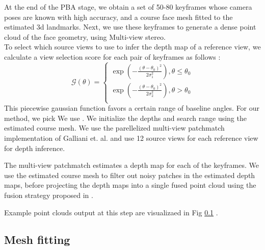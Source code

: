 \documentclass[10pt,twocolumn,letterpaper]{article}
\begin{document}
At the end of the PBA stage, we obtain a set of 50-80 keyframes whose camera poses are known with high accuracy, and a course face mesh fitted to the estimated 3d landmarks. Next, we use these keyframes to generate a dense point cloud of the face geometry, using Multi-view stereo.\\
To select which source views to use to infer the depth map of a reference view, we calculate a view selection score for each pair of keyframes as follows : 
\[ \mathcal{G}(\theta) =  \left\{
\begin{array}{ll}
      \exp(-\frac{(\theta - \theta_0)^2}{2\sigma_1^2}), \theta \leq \theta_0 \\
      \exp(-\frac{(\theta - \theta_0)^2}{2\sigma_2^2}), \theta > \theta_0 \\
\end{array} 
\right. \]
This piecewise gaussian function favors a certain range of baseline angles. For our method, we pick 
We use  . We initialize the depths and search range using the estimated course mesh. We use the parellelized multi-view patchmatch implementation of Galliani et. al. \cite{galliani2015massively} and use 12 source views for each reference view for depth inference.

The multi-view patchmatch estimates a depth map for each of the keyframes. We use the estimated course mesh to filter out noisy patches in the estimated depth maps, before projecting the depth maps into a single fused point cloud using the fusion strategy proposed in \cite{galliani2015massively}.

Example point clouds output at this step are visualizaed in Fig \ref{} . 

\subsection{Mesh fitting}
\end{document}
